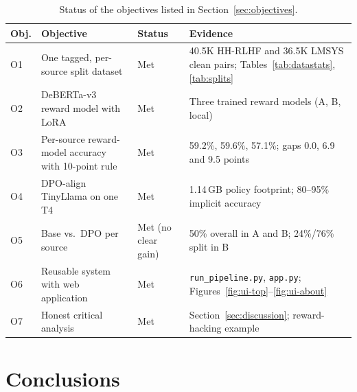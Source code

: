 \begin{table}[!htbp]
\centering
\caption[Status of objectives]{Status of the objectives listed in Section~\ref{sec:objectives}.}
\label{tab:objectives}
\small
\begin{tabularx}{\textwidth}{@{}L{0.8cm}YL{1.9cm}Y@{}}
\toprule
\textbf{Obj.} & \textbf{Objective} & \textbf{Status} & \textbf{Evidence}\\
\midrule
O1 & One tagged, per-source split dataset & Met & 40.5K HH-RLHF and 36.5K LMSYS clean pairs; Tables~\ref{tab:datastats}, \ref{tab:splits}\\
O2 & DeBERTa-v3 reward model with LoRA & Met & Three trained reward models (A, B, local)\\
O3 & Per-source reward-model accuracy with 10-point rule & Met & 59.2\%, 59.6\%, 57.1\%; gaps 0.0, 6.9 and 9.5 points\\
O4 & DPO-align TinyLlama on one T4 & Met & 1.14\,GB policy footprint; 80--95\% implicit accuracy\\
O5 & Base vs.\ DPO per source & Met (no clear gain) & 50\% overall in A and B; 24\%/76\% split in B\\
O6 & Reusable system with web application & Met & \texttt{run\_pipeline.py}, \texttt{app.py}; Figures~\ref{fig:ui-top}--\ref{fig:ui-about}\\
O7 & Honest critical analysis & Met & Section~\ref{sec:discussion}; reward-hacking example\\
\bottomrule
\end{tabularx}
\end{table}

\section{Conclusions}
\label{sec:conclusions}

